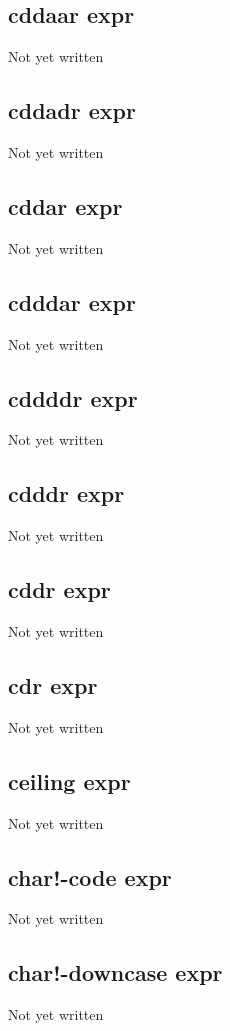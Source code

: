 \documentclass[a4paper,11pt]{article}
\begin{document}
\subsection{\ttfamily cddaar expr}
Not yet written

\subsection{\ttfamily cddadr expr}
Not yet written

\subsection{\ttfamily cddar expr}
Not yet written

\subsection{\ttfamily cdddar expr}
Not yet written

\subsection{\ttfamily cddddr expr}
Not yet written

\subsection{\ttfamily cdddr expr}
Not yet written

\subsection{\ttfamily cddr expr}
Not yet written

\subsection{\ttfamily cdr expr}
Not yet written

\subsection{\ttfamily ceiling expr}
Not yet written

\subsection{\ttfamily char!-code expr}
Not yet written

\subsection{\ttfamily char!-downcase expr}
Not yet written
\end{document}
